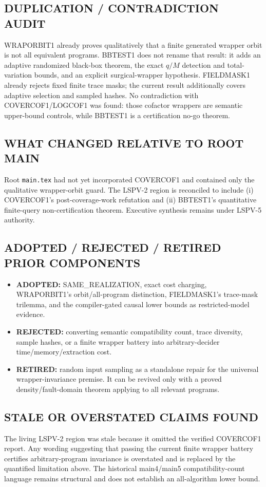 \documentclass[11pt]{article}
\begin{document}
\subsection*{DUPLICATION / CONTRADICTION AUDIT}
WRAPORBIT1 already proves qualitatively that a finite generated wrapper orbit is not all equivalent programs.  BBTEST1 does not rename that result: it adds an adaptive randomized black-box theorem, the exact $q/M$ detection and total-variation bounds, and an explicit surgical-wrapper hypothesis.  FIELDMASK1 already rejects fixed finite trace masks; the current result additionally covers adaptive selection and sampled hashes.  No contradiction with COVERCOF1/LOGCOF1 was found: those cofactor wrappers are semantic upper-bound controls, while BBTEST1 is a certification no-go theorem.

\subsection*{WHAT CHANGED RELATIVE TO ROOT MAIN}
Root \texttt{main.tex} had not yet incorporated COVERCOF1 and contained only the qualitative wrapper-orbit guard.  The LSPV-2 region is reconciled to include (i) COVERCOF1's post-coverage-work refutation and (ii) BBTEST1's quantitative finite-query non-certification theorem.  Executive synthesis remains under LSPV-5 authority.

\subsection*{ADOPTED / REJECTED / RETIRED PRIOR COMPONENTS}
\begin{itemize}[leftmargin=*]
\item \textbf{ADOPTED:} SAME\_REALIZATION, exact cost charging, WRAPORBIT1's orbit/all-program distinction, FIELDMASK1's trace-mask trilemma, and the compiler-gated causal lower bounds as restricted-model evidence.
\item \textbf{REJECTED:} converting semantic compatibility count, trace diversity, sample hashes, or a finite wrapper battery into arbitrary-decider time/memory/extraction cost.
\item \textbf{RETIRED:} random input sampling as a standalone repair for the universal wrapper-invariance premise.  It can be revived only with a proved density/fault-domain theorem applying to all relevant programs.
\end{itemize}

\subsection*{STALE OR OVERSTATED CLAIMS FOUND}
The living LSPV-2 region was stale because it omitted the verified COVERCOF1 report.  Any wording suggesting that passing the current finite wrapper battery certifies arbitrary-program invariance is overstated and is replaced by the quantified limitation above.  The historical main4/main5 compatibility-count language remains structural and does not establish an all-algorithm lower bound.
\end{document}
